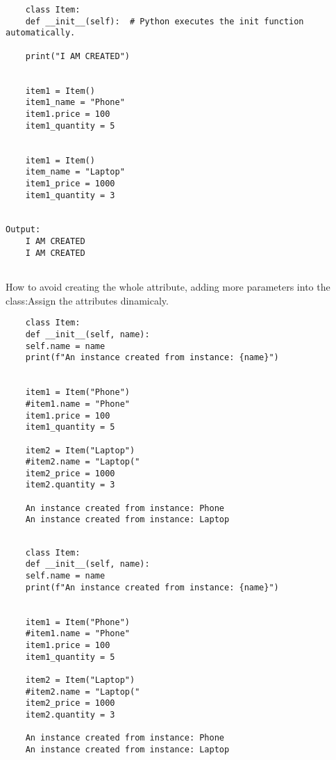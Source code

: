 \documentclass{article}
\begin{document}
\begin{lstlisting}
	class Item:
	def __init__(self):  # Python executes the init function automatically.
	
	print("I AM CREATED")
	
	
	item1 = Item()
	item1_name = "Phone"
	item1.price = 100
	item1_quantity = 5
	
	
	item1 = Item()
	item_name = "Laptop"
	item1_price = 1000
	item1_quantity = 3


Output:
	I AM CREATED
	I AM CREATED
	
\end{lstlisting}
How to avoid creating the whole attribute, adding more parameters into the class:Assign the attributes dinamicaly. 
\begin{lstlisting}
	class Item:
	def __init__(self, name):
	self.name = name
	print(f"An instance created from instance: {name}")
	
	
	item1 = Item("Phone")
	#item1.name = "Phone"
	item1.price = 100
	item1_quantity = 5
	
	item2 = Item("Laptop")
	#item2.name = "Laptop("
	item2_price = 1000
	item2.quantity = 3
	
	An instance created from instance: Phone
	An instance created from instance: Laptop
	
\end{lstlisting}


\begin{lstlisting}
	class Item:
	def __init__(self, name):
	self.name = name
	print(f"An instance created from instance: {name}")
	
	
	item1 = Item("Phone")
	#item1.name = "Phone"
	item1.price = 100
	item1_quantity = 5
	
	item2 = Item("Laptop")
	#item2.name = "Laptop("
	item2_price = 1000
	item2.quantity = 3
	
	An instance created from instance: Phone
	An instance created from instance: Laptop
	
\end{lstlisting}

	
\end{document}
